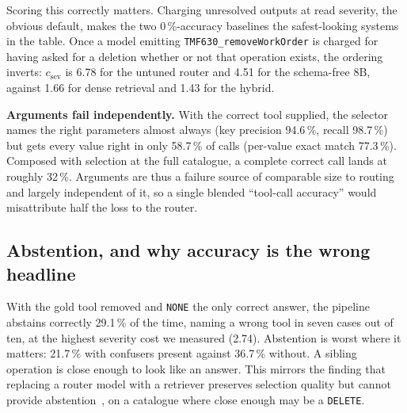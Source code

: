 Scoring this correctly matters. Charging unresolved outputs at read severity, the obvious default, makes the two 0\,\%-accuracy baselines the
safest-looking systems in the table. Once a model emitting
\texttt{TMF630\_\allowbreak removeWorkOrder} is charged for having asked for a deletion
whether or not that operation exists, the ordering inverts: $c_{\mathrm{sev}}$
is 6.78 for the untuned router and 4.51 for the schema-free 8B, against 1.66
for dense retrieval and 1.43 for the hybrid.

\smallskip\noindent\textbf{Arguments fail independently.} With the correct tool supplied, the selector names the right parameters almost always (key precision 94.6\,\%,
recall 98.7\,\%) but gets every value right in only 58.7\,\% of calls
(per-value exact match 77.3\,\%). Composed with selection at the full
catalogue, a complete correct call lands at roughly 32\,\%. Arguments are thus a failure source of comparable size to routing and largely
independent of it, so a single blended ``tool-call accuracy'' would misattribute
half the loss to the router.

\subsection{Abstention, and why accuracy is the wrong headline}
With the gold tool removed and \texttt{NONE} the only correct answer, the
pipeline abstains correctly 29.1\,\% of the time, naming a wrong tool in seven cases out of ten, at the highest severity cost we measured (2.74).
Abstention is worst where it matters: 21.7\,\% with confusers present against
36.7\,\% without. A sibling operation is close enough to look like an answer.
This mirrors the finding that replacing a router model with a retriever preserves
selection quality but cannot provide abstention~\cite{ondevice_routing}, on a
catalogue where close enough may be a \texttt{DELETE}.
